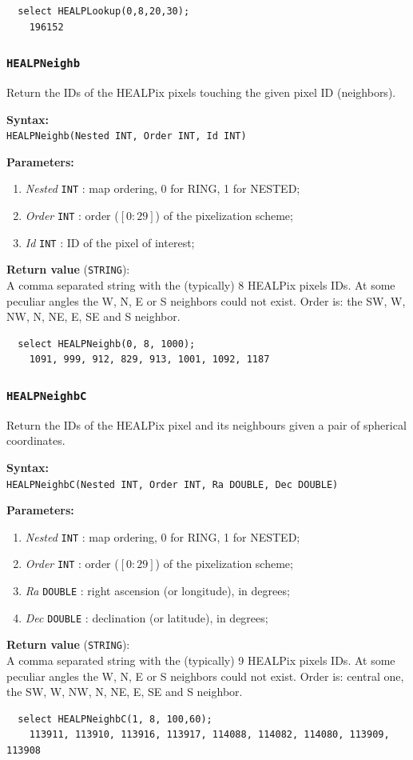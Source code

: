 \documentclass[10pt,titlepage]{article}
\newcommand{\syntax}[1]
{
  \bigskip
  \noindent
  \textbf{Syntax:} \\ 
  \indent \texttt{#1}
}
\newenvironment{parameters}
{
  \medskip
  \noindent
  \textbf{Parameters:}
  \begin{enumerate}
}
{
  \end{enumerate}
}
\newcommand{\param}[2]
{
  \item \textit{#1} \texttt{#2} 
}
\newcommand{\return}[1]
{
  \medskip
  \noindent
  \textbf{Return value} (\texttt{#1}): \\
  \indent
}
\newcommand{\example}
{
\medskip
\noindent{\textbf{Example:}}
}
\begin{document}
\example
%
\begin{verbatim}
  select HEALPLookup(0,8,20,30);
    196152
\end{verbatim}
%
%

\subsubsection{{\tt HEALPNeighb}}
Return the IDs of the HEALPix pixels touching the given pixel ID (neighbors).

\syntax{HEALPNeighb(Nested INT, Order INT, Id INT)}

\begin{parameters}
  \param{Nested}{INT}: map ordering, 0 for RING, 1 for NESTED;
  \param{Order}{INT}: order ($[0:29]$) of the pixelization scheme;
  \param{Id}{INT}: ID of the pixel of interest;
\end{parameters}

\return{STRING} A comma separated string with the (typically) 8 HEALPix pixels
IDs. At some peculiar angles the W, N, E or S neighbors could not exist.
Order is: the SW, W, NW, N, NE, E, SE and S neighbor.

\example
%
\begin{verbatim}
  select HEALPNeighb(0, 8, 1000);
    1091, 999, 912, 829, 913, 1001, 1092, 1187
\end{verbatim}
%
%

\subsubsection{{\tt HEALPNeighbC}}
Return the IDs of the HEALPix pixel and its neighbours given a pair of
spherical coordinates.

\syntax{HEALPNeighbC(Nested INT, Order INT, Ra DOUBLE, Dec DOUBLE)}

\begin{parameters}
  \param{Nested}{INT}: map ordering, 0 for RING, 1 for NESTED;
  \param{Order}{INT}: order ($[0:29]$) of the pixelization scheme;
  \param{Ra}{DOUBLE}: right ascension (or longitude), in degrees;
  \param{Dec}{DOUBLE}: declination (or latitude), in degrees;
\end{parameters}

\return{STRING} A comma separated string with the (typically) 9 HEALPix pixels
IDs. At some peculiar angles the W, N, E or S neighbors could not exist.
Order is: central one, the SW, W, NW, N, NE, E, SE and S neighbor.

\example
%
\begin{verbatim}
  select HEALPNeighbC(1, 8, 100,60);
    113911, 113910, 113916, 113917, 114088, 114082, 114080, 113909, 113908
\end{verbatim}
%
%
\end{document}
